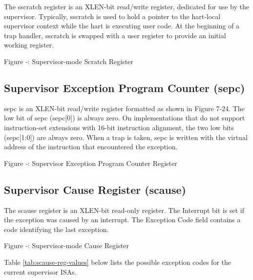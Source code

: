The sscratch register is an XLEN-bit read/write register, dedicated for
use by the supervisor. Typically, sscratch is used to hold a pointer to
the hart-local supervisor context while the hart is executing user code.
At the beginning of a trap handler, sscratch is swapped with a user
register to provide an initial working register.

\missingfigure{}

Figure ‑: Supervisor-mode Scratch Register

\subsection{Supervisor Exception Program Counter
(sepc)}\label{supervisor-exception-program-counter-sepc}

sepc is an XLEN-bit read/write register formatted as shown in Figure
7‑24. The low bit of sepc (sepc{[}0{]}) is always zero. On
implementations that do not support instruction-set extensions with
16-bit instruction alignment, the two low bits (sepc{[}1:0{]}) are
always zero. When a trap is taken, sepc is written with the virtual
address of the instruction that encountered the exception.

\missingfigure{}

\protect\hypertarget{_Ref367098363}{}{}Figure ‑: Supervisor Exception
Program Counter Register

\subsection{Supervisor Cause Register (scause)
}\label{supervisor-cause-register-scause}

The scause register is an XLEN-bit read-only register. The Interrupt bit
is set if the exception was caused by an interrupt. The Exception Code
field contains a code identifying the last exception.

\missingfigure{}

Figure ‑: Supervisor-mode Cause Register

Table \ref{tab:scause-reg-values} below lists the possible exception codes for the current supervisor ISAs.

